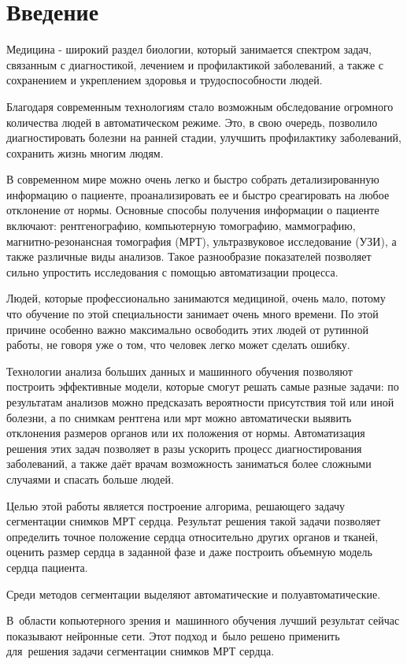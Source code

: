 \section{Введение}
Медицина - широкий раздел биологии, который занимается спектром задач, связанным с диагностикой, лечением и профилактикой заболеваний, а также с сохранением и укреплением здоровья и трудоспособности людей. 

Благодаря современным технологиям стало возможным обследование огромного количества людей в автоматическом режиме. Это, в свою очередь, позволило диагностировать болезни на ранней стадии, улучшить профилактику заболеваний, сохранить жизнь многим людям.

В современном мире можно очень легко и быстро собрать детализированную информацию о пациенте, проанализировать ее и быстро среагировать на любое отклонение от нормы. Основные способы получения информации о пациенте включают: рентгенографию, компьютерную томографию, маммографию, магнитно-резонансная томография (МРТ), ультразвуковое исследование (УЗИ), а также различные виды анализов. Такое разнообразие показателей позволяет сильно упростить исследования с помощью автоматизации процесса.

Людей, которые профессионально занимаются медициной, очень мало, потому что обучение по этой специальности занимает очень много времени. По этой причине особенно важно максимально освободить этих людей от рутинной работы, не говоря уже о том, что человек легко может сделать ошибку.

Технологии анализа больших данных и машинного обучения позволяют построить эффективные модели, которые смогут решать самые разные задачи: по результатам анализов можно предсказать вероятности присутствия той или иной болезни, а по снимкам рентгена или мрт можно автоматически выявить отклонения размеров органов или их положения от нормы. Автоматизация решения этих задач позволяет в разы ускорить процесс диагностирования заболеваний, а также даёт врачам возможность заниматься более сложными случаями и спасать больше людей.

Целью этой работы является построение алгорима, решающего задачу сегментации снимков МРТ сердца. Результат решения такой задачи позволяет определить точное положение сердца относительно других органов и тканей, оценить размер сердца в заданной фазе и даже построить объемную модель сердца пациента.

Среди методов сегментации выделяют автоматические и полуавтоматические. 

В~области копьютерного зрения и~машинного обучения лучший результат сейчас показывают нейронные сети. Этот подход и~было решено применить для~решения задачи сегментации снимков МРТ сердца.

